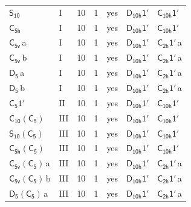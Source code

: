 \documentclass[10pt,a4paper]{article}
\numberwithin{equation}{section}
\newcommand{\grp}[1]{\mathsf{#1}}
\newcommand{\clsletter}[1]{\,{\scriptsize\color{black!55}#1}}
\begin{document}
{\begin{longtable}{@{}llrrlll@{}}
\href{../../../rotation/data/pdf/S10.pdf}{$\grp{S_{10}}$} & I & 10 & 1 & yes & \href{D10h-1p.pdf}{$\grp{D_{10h}1'}$} & \href{C10h-1p.pdf}{$\grp{C_{10h}1'}$}\\
\href{../../../rotation/data/pdf/C5h.pdf}{$\grp{C_{5h}}$} & I & 10 & 1 & yes & \href{D10h-1p.pdf}{$\grp{D_{10h}1'}$} & \href{C10h-1p.pdf}{$\grp{C_{10h}1'}$}\\
\href{../../../rotation/data/pdf/C5v.pdf}{$\grp{C_{5v}}$}\clsletter{a} & I & 10 & 1 & yes & \href{D10h-1p.pdf}{$\grp{D_{10h}1'}$} & \href{C2h-1p.pdf}{$\grp{C_{2h}1'}$}\clsletter{a}\\
\href{../../../rotation/data/pdf/C5v.pdf}{$\grp{C_{5v}}$}\clsletter{b} & I & 10 & 1 & yes & \href{D10h-1p.pdf}{$\grp{D_{10h}1'}$} & \href{C2h-1p.pdf}{$\grp{C_{2h}1'}$}\clsletter{a}\\
\href{../../../rotation/data/pdf/D5.pdf}{$\grp{D_{5}}$}\clsletter{a} & I & 10 & 1 & yes & \href{D10h-1p.pdf}{$\grp{D_{10h}1'}$} & \href{C2h-1p.pdf}{$\grp{C_{2h}1'}$}\clsletter{a}\\
\href{../../../rotation/data/pdf/D5.pdf}{$\grp{D_{5}}$}\clsletter{b} & I & 10 & 1 & yes & \href{D10h-1p.pdf}{$\grp{D_{10h}1'}$} & \href{C2h-1p.pdf}{$\grp{C_{2h}1'}$}\clsletter{a}\\
\href{C5-1p.pdf}{$\grp{C_{5}1'}$} & II & 10 & 1 & yes & \href{D10h-1p.pdf}{$\grp{D_{10h}1'}$} & \href{C10h-1p.pdf}{$\grp{C_{10h}1'}$}\\
\href{C10-C5.pdf}{$\grp{C_{10}}(\grp{C_{5}})$} & III & 10 & 1 & yes & \href{D10h-1p.pdf}{$\grp{D_{10h}1'}$} & \href{C10h-1p.pdf}{$\grp{C_{10h}1'}$}\\
\href{S10-C5.pdf}{$\grp{S_{10}}(\grp{C_{5}})$} & III & 10 & 1 & yes & \href{D10h-1p.pdf}{$\grp{D_{10h}1'}$} & \href{C10h-1p.pdf}{$\grp{C_{10h}1'}$}\\
\href{C5h-C5.pdf}{$\grp{C_{5h}}(\grp{C_{5}})$} & III & 10 & 1 & yes & \href{D10h-1p.pdf}{$\grp{D_{10h}1'}$} & \href{C10h-1p.pdf}{$\grp{C_{10h}1'}$}\\
\href{C5v-C5.pdf}{$\grp{C_{5v}}(\grp{C_{5}})$}\clsletter{a} & III & 10 & 1 & yes & \href{D10h-1p.pdf}{$\grp{D_{10h}1'}$} & \href{C2h-1p.pdf}{$\grp{C_{2h}1'}$}\clsletter{a}\\
\href{C5v-C5.pdf}{$\grp{C_{5v}}(\grp{C_{5}})$}\clsletter{b} & III & 10 & 1 & yes & \href{D10h-1p.pdf}{$\grp{D_{10h}1'}$} & \href{C2h-1p.pdf}{$\grp{C_{2h}1'}$}\clsletter{a}\\
\href{D5-C5.pdf}{$\grp{D_{5}}(\grp{C_{5}})$}\clsletter{a} & III & 10 & 1 & yes & \href{D10h-1p.pdf}{$\grp{D_{10h}1'}$} & \href{C2h-1p.pdf}{$\grp{C_{2h}1'}$}\clsletter{a}\\

\end{longtable}}
\end{document}
